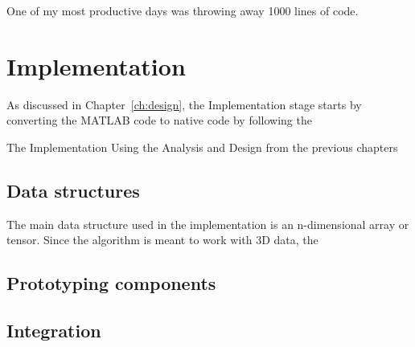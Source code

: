 
\begin{savequote}[0.55\linewidth]
	\begin{fancyquote}
	One of my most productive days was throwing away 1000 lines of code.
	\end{fancyquote}
\end{savequote}
\chapter{Implementation}\label{ch:implementation}

As discussed in Chapter~\ref{ch:design}, the Implementation stage
starts by converting the MATLAB code to native code by following
the 

The Implementation
Using the Analysis and Design from the previous chapters

\section{Data structures}

The main data structure used in the implementation is an
n-dimensional array or tensor. Since the algorithm is meant to
work with 3D data, the 

\section{Prototyping components}

\section{Integration}

